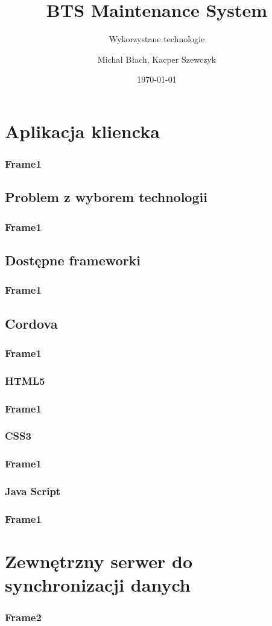 \documentclass{beamer}
\title{BTS Maintenance System }
\subtitle{Wykorzystane technologie}
\author{Michał Błach, Kacper Szewczyk}
\date{\today}
\begin{document}
\begin{frame}
\titlepage
\end{frame}
\begin{frame}
\tableofcontents
\end{frame}

\section{Aplikacja kliencka}
\begin{frame}
\frametitle{Frame1}
\end{frame}
\subsection{Problem z wyborem technologii}
\begin{frame}
\frametitle{Frame1}
\end{frame}
\subsection{Dostępne frameworki}
\begin{frame}
\frametitle{Frame1}
\end{frame}
\subsection{Cordova}
\begin{frame}
\frametitle{Frame1}
\end{frame}
\subsubsection{HTML5}
\begin{frame}
\frametitle{Frame1}
\end{frame}
\subsubsection{CSS3}
\begin{frame}
\frametitle{Frame1}
\end{frame}
\subsubsection{Java Script}
\begin{frame}
\frametitle{Frame1}
\end{frame}
\section{Zewnętrzny serwer do synchronizacji danych}
\begin{frame}
\frametitle{Frame2}
\end{frame}
\end{document}
